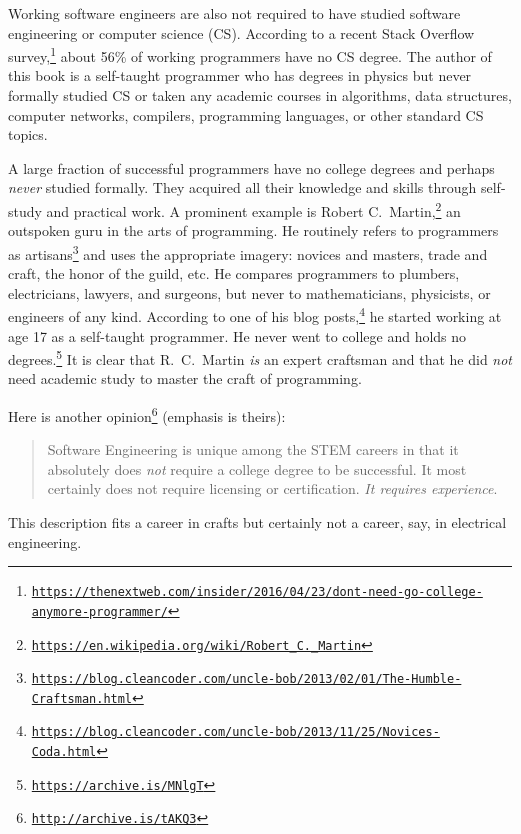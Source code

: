 Working software engineers are also not required to have studied software
engineering or computer science (CS). According to a recent Stack
Overflow survey,\footnote{\texttt{\href{https://thenextweb.com/insider/2016/04/23/dont-need-go-college-anymore-programmer/}{https://thenextweb.com/insider/2016/04/23/dont-need-go-college-anymore-programmer/}}}
about 56\% of working programmers have no CS degree. The author of
this book is a self-taught programmer who has degrees in physics but
never formally studied CS or taken any academic courses in algorithms,
data structures, computer networks, compilers, programming languages,
or other standard CS topics. 

A large fraction of successful programmers have no college degrees
and perhaps \emph{never} studied formally. They acquired all their
knowledge and skills through self-study and practical work. A prominent
example is Robert C.~Martin,\footnote{\texttt{\href{https://en.wikipedia.org/wiki/Robert_C._Martin}{https://en.wikipedia.org/wiki/Robert\_C.\_Martin}}}
an outspoken guru in the arts of programming. He routinely refers
to programmers as artisans\footnote{\texttt{\href{https://blog.cleancoder.com/uncle-bob/2013/02/01/The-Humble-Craftsman.html}{https://blog.cleancoder.com/uncle-bob/2013/02/01/The-Humble-Craftsman.html}}}
and uses the appropriate imagery: novices and masters, trade and craft,
the honor of the guild, etc. He compares programmers to plumbers,
electricians, lawyers, and surgeons, but never to mathematicians,
physicists, or engineers of any kind. According to one of his blog
posts,\footnote{\texttt{\href{https://blog.cleancoder.com/uncle-bob/2013/11/25/Novices-Coda.html}{https://blog.cleancoder.com/uncle-bob/2013/11/25/Novices-Coda.html}}}
he started working at age 17 as a self-taught programmer. He never
went to college and holds no degrees.\footnote{\texttt{\href{https://hashnode.com/post/i-am-robert-c-martin-uncle-bob-ask-me-anything-cjr7pnh8g000k2cs18o5nhulp/2}{https://archive.is/MNlgT}}}
It is clear that R.~C.~Martin \emph{is} an expert craftsman and
that he did \emph{not} need academic study to master the craft of
programming.

Here is another opinion\footnote{\texttt{\href{http://archive.is/tAKQ3}{http://archive.is/tAKQ3}}}
(emphasis is theirs):
\begin{quotation}
{\small{}Software Engineering is unique among the STEM careers in
that it absolutely does }\emph{\small{}not}{\small{} require a college
degree to be successful. It most certainly does not require licensing
or certification. }\emph{\small{}It requires experience}{\small{}.}{\small\par}
\end{quotation}
This description fits a career in crafts \textemdash{} but certainly
not a career, say, in electrical engineering.

